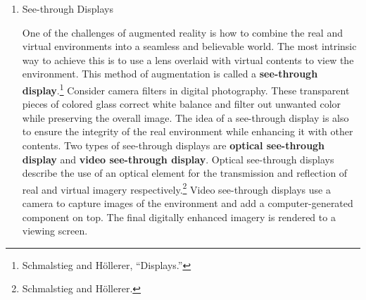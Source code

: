 \begin{enumerate}
	\item See-through Displays

One of the challenges of augmented reality is how to combine the real and virtual environments into a seamless and believable world. The most intrinsic way to achieve this is to use a lens overlaid with virtual contents to view the environment. This method of augmentation is called a \textbf{see-through display}.\footnote{Schmalstieg and Höllerer, “Displays.”} Consider camera filters in digital photography. These transparent pieces of colored glass correct white balance and filter out unwanted color while preserving the overall image. The idea of a see-through display is also to ensure the integrity of the real environment while enhancing it with other contents. Two types of see-through displays are \textbf{optical see-through display} and \textbf{video see-through display}. Optical see-through displays describe the use of an optical element for the transmission and reflection of real and virtual imagery respectively.\footnote{Schmalstieg and Höllerer.} Video see-through displays use a camera to capture images of the environment and add a computer-generated component on top. The final digitally enhanced imagery is rendered to a viewing screen.

\begin{figure}[!ht]
\vspace{-.1 in}
\end{figure}


\end{enumerate}
